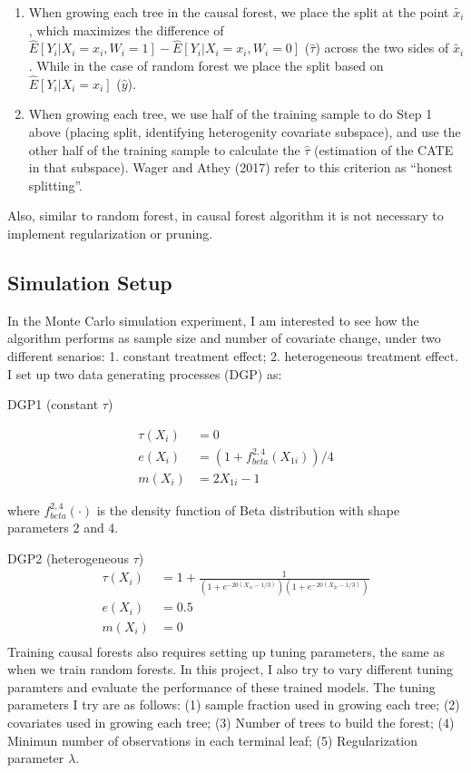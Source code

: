 \documentclass[]{article}
\begin{document}
\begin{enumerate}
\def\labelenumi{\arabic{enumi}.}
\item
  When growing each tree in the causal forest, we place the split at the
  point \(\tilde{x_{i}}\), which maximizes the difference of
  \(\hat{E}[Y_{i} | X_{i}=x_{i}, W_{i}=1] - \hat{E}[Y_{i} | X_{i}=x_{i}, W_{i}=0]\)
  (\(\hat{\tau}\)) across the two sides of \(\tilde{x_{i}}\). While in
  the case of random forest we place the split based on
  \(\hat{E}[Y_{i} | X_{i}=x_{i}]\) (\(\hat{y}\)).
\item
  When growing each tree, we use half of the training sample to do Step
  1 above (placing split, identifying heterogenity covariate subspace),
  and use the other half of the training sample to calculate the
  \(\hat{\tau}\) (estimation of the CATE in that subspace). Wager and
  Athey (2017) refer to this criterion as ``honest splitting''.
\end{enumerate}

Also, similar to random forest, in causal forest algorithm it is not
necessary to implement regularization or pruning.

\subsection{Simulation Setup}\label{simulation-setup}

In the Monte Carlo simulation experiment, I am interested to see how the
algorithm performs as sample size and number of covariate change, under
two different senarios: 1. constant treatment effect; 2. heterogeneous
treatment effect. I set up two data generating processes (DGP) as:

DGP1 (constant \(\tau\))

\[
\begin{aligned}
\tau(X_{i})&=0  \\
e(X_{i})&=(1+f_{beta}^{2,4}(X_{1i}))/4 \\
m(X_{i})&=2X_{1i}-1 
\end{aligned}
\]

where \(f_{beta}^{2,4}(\cdot)\) is the density function of Beta
distribution with shape parameters 2 and 4.

DGP2 (heterogeneous \(\tau\)) \[
\begin{aligned}
\tau(X_{i})&=1+\frac{1}{(1+e^{-20(X_{1i}-1/3)})(1+e^{-20(X_{2i}-1/3)})} \\  
e(X_{i})&=0.5  \\
m(X_{i})&=0  \\
\end{aligned}
\] Training causal forests also requires setting up tuning parameters,
the same as when we train random forests. In this project, I also try to
vary different tuning paramters and evaluate the performance of these
trained models. The tuning parameters I try are as follows: (1) sample
fraction used in growing each tree; (2) covariates used in growing each
tree; (3) Number of trees to build the forest; (4) Minimun number of
observations in each terminal leaf; (5) Regularization parameter
\(\lambda\).
\end{document}
